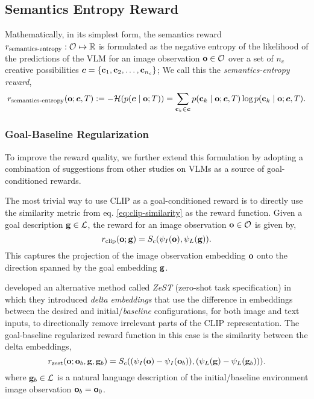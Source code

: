 \subsection{Semantics Entropy Reward}
\label{sec:entropy-reward}

Mathematically, in its simplest form, the semantics reward \(r_{\text{semantics-entropy}}: \mathcal{O} \mapsto \mathbb{R}\) is formulated as the negative entropy of the likelihood of the predictions of the VLM for an image observation \(\mathbf{o} \in \mathcal{O}\) over a set of \(n_c\) creative possibilities \(\bm{c} = \{ \mathbf{c}_1, \mathbf{c}_2, \ldots, \mathbf{c}_{n_c} \}\);
We call this the \emph{semantics-entropy reward},
\begin{equation}
    \label{eq:entropy-reward}
    r_{\text{semantics-entropy}}(\mathbf{o}; \bm{c}, T) := -\mathcal{H}(p(\bm{c} \mid \mathbf{o}; T)) = \sum_{\mathbf{c}_k \in \bm{c}} p(\mathbf{c}_k \mid \mathbf{o}; \bm{c}, T) \log p(\mathbf{c}_k \mid \mathbf{o}; \bm{c}, T).
\end{equation}
% 
\subsubsection{Goal-Baseline Regularization}
\label{sec:goal-baseline}
To improve the reward quality, we further extend this formulation by adopting a combination of suggestions from other studies on VLMs as a source of goal-conditioned rewards.

The most trivial way to use CLIP as a goal-conditioned reward is to directly use the similarity metric from eq. \eqref{eq:clip-similarity} as the reward function.
Given a goal description \(\mathbf{g} \in \mathcal{L}\), the reward for an image observation \(\mathbf{o} \in \mathcal{O}\) is given by,
\begin{equation}
    \label{eq:trivial-reward}
    r_{\text{clip}}(\mathbf{o}; \mathbf{g}) = S_c(\psi_I(\mathbf{o}), \psi_L(\mathbf{g})).
\end{equation}
This captures the projection of the image observation embedding \(\mathbf{o}\) onto the direction spanned by the goal embedding \(\mathbf{g}\).

\cite{zest} developed an alternative method called \emph{ZeST} (zero-shot task specification) in which they introduced \emph{delta embeddings} that use the difference in embeddings between the desired and initial/\emph{baseline} configurations, for both image and text inputs, to directionally remove irrelevant parts of the CLIP representation.
The goal-baseline regularized reward function in this case is the similarity between the delta embeddings,
\begin{equation}
    \label{eq:zest}
    r_{\text{zest}}(\mathbf{o}; \mathbf{o}_b, \mathbf{g}, \mathbf{g}_b) = S_c((\psi_I(\mathbf{o}) - \psi_I(\mathbf{o}_b)), (\psi_L(\mathbf{g}) - \psi_L(\mathbf{g}_b))).
\end{equation}
where \(\mathbf{g}_b \in \mathcal{L}\) is a natural language description of the initial/baseline environment image observation \(\mathbf{o}_b = \mathbf{o}_0\).

